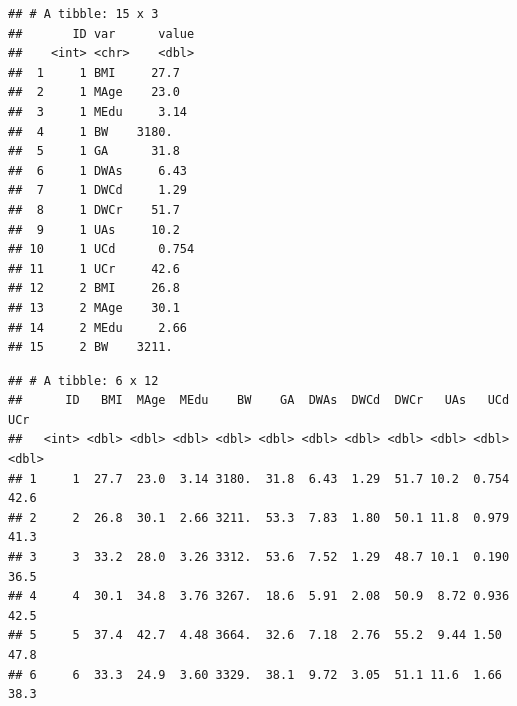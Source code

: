 \documentclass[
]{book}
\newenvironment{Shaded}{\begin{snugshade}}{\end{snugshade}}
\newcommand{\CommentTok}[1]{\textcolor[rgb]{0.56,0.35,0.01}{\textit{#1}}}
\newcommand{\DataTypeTok}[1]{\textcolor[rgb]{0.13,0.29,0.53}{#1}}
\newcommand{\DecValTok}[1]{\textcolor[rgb]{0.00,0.00,0.81}{#1}}
\newcommand{\KeywordTok}[1]{\textcolor[rgb]{0.13,0.29,0.53}{\textbf{#1}}}
\newcommand{\NormalTok}[1]{#1}
\newcommand{\OperatorTok}[1]{\textcolor[rgb]{0.81,0.36,0.00}{\textbf{#1}}}
\newcommand{\StringTok}[1]{\textcolor[rgb]{0.31,0.60,0.02}{#1}}
\begin{document}
\begin{Shaded}
\end{Shaded}

\begin{verbatim}
## # A tibble: 15 x 3
##       ID var      value
##    <int> <chr>    <dbl>
##  1     1 BMI     27.7  
##  2     1 MAge    23.0  
##  3     1 MEdu     3.14 
##  4     1 BW    3180.   
##  5     1 GA      31.8  
##  6     1 DWAs     6.43 
##  7     1 DWCd     1.29 
##  8     1 DWCr    51.7  
##  9     1 UAs     10.2  
## 10     1 UCd      0.754
## 11     1 UCr     42.6  
## 12     2 BMI     26.8  
## 13     2 MAge    30.1  
## 14     2 MEdu     2.66 
## 15     2 BW    3211.
\end{verbatim}

\begin{Shaded}
\end{Shaded}

\begin{verbatim}
## # A tibble: 6 x 12
##      ID   BMI  MAge  MEdu    BW    GA  DWAs  DWCd  DWCr   UAs   UCd   UCr
##   <int> <dbl> <dbl> <dbl> <dbl> <dbl> <dbl> <dbl> <dbl> <dbl> <dbl> <dbl>
## 1     1  27.7  23.0  3.14 3180.  31.8  6.43  1.29  51.7 10.2  0.754  42.6
## 2     2  26.8  30.1  2.66 3211.  53.3  7.83  1.80  50.1 11.8  0.979  41.3
## 3     3  33.2  28.0  3.26 3312.  53.6  7.52  1.29  48.7 10.1  0.190  36.5
## 4     4  30.1  34.8  3.76 3267.  18.6  5.91  2.08  50.9  8.72 0.936  42.5
## 5     5  37.4  42.7  4.48 3664.  32.6  7.18  2.76  55.2  9.44 1.50   47.8
## 6     6  33.3  24.9  3.60 3329.  38.1  9.72  3.05  51.1 11.6  1.66   38.3
\end{verbatim}
\end{document}
